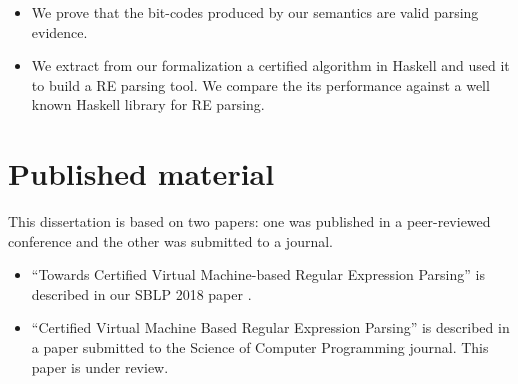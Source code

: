 \documentclass[oneside,12pt]{scrbook}
\theoremstyle{definition}
\theoremstyle{plain}
\theoremstyle{definition}
\begin{document}
\begin{itemize}
	\item We prove that the bit-codes produced by our semantics are valid parsing evidence.
	\item We extract from our formalization a certified algorithm in Haskell and used it	to build a RE parsing tool. We compare the its performance against a well known Haskell library for RE parsing. 

\end{itemize}

\section{Published material}
\label{section:published}
This dissertation is based on two papers: one was published in a peer-reviewed conference and the other was submitted to a journal.

\begin{itemize}
	\item ``Towards Certified Virtual Machine-based Regular Expression Parsing'' is described in our SBLP 2018 paper \cite{DelfinoRibeiro2018}.
	\item ``Certified Virtual Machine Based Regular Expression Parsing'' is described in a paper submitted to the Science of Computer Programming journal. This paper is under review.
\end{itemize}
\end{document}
